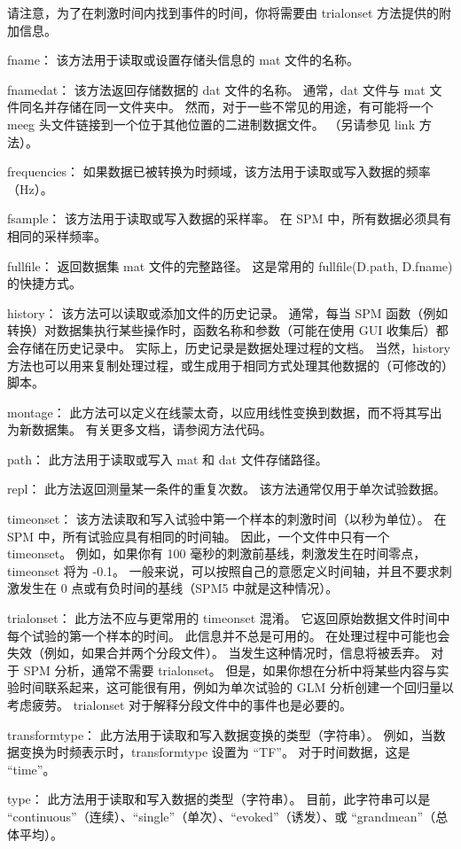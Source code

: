 请注意，为了在刺激时间内找到事件的时间，你将需要由 trialonset 方法提供的附加信息。

fname：
该方法用于读取或设置存储头信息的 mat 文件的名称。

fnamedat：
该方法返回存储数据的 dat 文件的名称。
通常，dat 文件与 mat 文件同名并存储在同一文件夹中。
然而，对于一些不常见的用途，有可能将一个 meeg 头文件链接到一个位于其他位置的二进制数据文件。
（另请参见 link 方法）。

frequencies：
如果数据已被转换为时频域，该方法用于读取或写入数据的频率（Hz）。

fsample：
该方法用于读取或写入数据的采样率。
在 SPM 中，所有数据必须具有相同的采样频率。

fullfile：
返回数据集 mat 文件的完整路径。
这是常用的 fullfile(D.path, D.fname) 的快捷方式。

history：
该方法可以读取或添加文件的历史记录。
通常，每当 SPM 函数（例如转换）对数据集执行某些操作时，函数名称和参数（可能在使用 GUI 收集后）都会存储在历史记录中。
实际上，历史记录是数据处理过程的文档。
当然，history 方法也可以用来复制处理过程，或生成用于相同方式处理其他数据的（可修改的）脚本。

montage：
此方法可以定义在线蒙太奇，以应用线性变换到数据，而不将其写出为新数据集。
有关更多文档，请参阅方法代码。

path：
此方法用于读取或写入 mat 和 dat 文件存储路径。

repl：
此方法返回测量某一条件的重复次数。
该方法通常仅用于单次试验数据。

timeonset：
该方法读取和写入试验中第一个样本的刺激时间（以秒为单位）。
在 SPM 中，所有试验应具有相同的时间轴。
因此，一个文件中只有一个 timeonset。
例如，如果你有 100 毫秒的刺激前基线，刺激发生在时间零点，timeonset 将为 -0.1。
一般来说，可以按照自己的意愿定义时间轴，并且不要求刺激发生在 0 点或有负时间的基线（SPM5 中就是这种情况）。

trialonset：
此方法不应与更常用的 timeonset 混淆。
它返回原始数据文件时间中每个试验的第一个样本的时间。
此信息并不总是可用的。
在处理过程中可能也会失效（例如，如果合并两个分段文件）。
当发生这种情况时，信息将被丢弃。
对于 SPM 分析，通常不需要 trialonset。
但是，如果你想在分析中将某些内容与实验时间联系起来，这可能很有用，例如为单次试验的 GLM 分析创建一个回归量以考虑疲劳。
trialonset 对于解释分段文件中的事件也是必要的。

transformtype：
此方法用于读取和写入数据变换的类型（字符串）。
例如，当数据变换为时频表示时，transformtype 设置为 “TF”。
对于时间数据，这是 “time”。

type：
此方法用于读取和写入数据的类型（字符串）。
目前，此字符串可以是 “continuous”（连续）、“single”（单次）、“evoked”（诱发）、或 “grandmean”（总体平均）。

